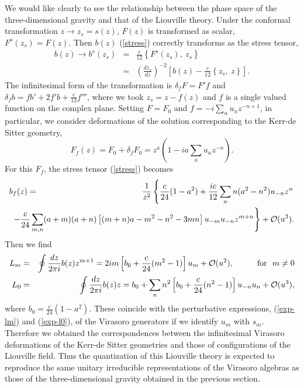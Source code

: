 \documentclass[a4paper,11pt]{article}
\begin{document}
We would like clearly to see the relationship between 
the phase space of the three-dimensional gravity and 
that of the Liouville theory.
Under the conformal transformation $z\longrightarrow z_s=s(z)$, 
$F(z)$ is transformed as scalar, $F^s(z_s)=F(z)$.
Then $b(z)$ (\ref{stress}) correctly transforms as the stress tensor,
\begin{eqnarray}
b(z)\longrightarrow b^s(z_s) 
 &=& \frac{c}{12}\left\{F^s(z_s), \ z_s\right\} \nonumber \\
 &=& \left(\frac{dz_s}{dz}\right)^{-2}
  \left[b(z)-\frac{c}{12}\left\{z_s, \ z\right\}\right].
\end{eqnarray}
The infinitesimal form of the transformation is $\delta_f F=F'f$ 
and $\delta_f b =fb'+2f'b+\frac{c}{12}f'''$, 
where we took $z_s=z-f(z)$ and $f$ is a single valued function on the complex
plane.
Setting $F=F_0$ and $f=-i\sum_n u_n z^{-n+1}$, in particular, 
we consider deformations of the solution 
corresponding to the Kerr-de Sitter geometry,
\begin{equation}
 F_f(z)=F_0+\delta_f F_0=z^a\left(1-ia\sum_n u_nz^{-n}\right).
\end{equation}
For this $F_f$, the stress tensor (\ref{stress}) becomes
\begin{eqnarray}
b_f(z)&=&\frac{1}{z^2}\left\{\frac{c}{24}(1-a^2)
      +\frac{ic}{12}\sum_n n(a^2-n^2)u_{-n}z^n \right. \nonumber \\
&& \hspace*{-13.5mm}   
   \left. -\frac{c}{24}\sum_{m,n}(a+m)(a+n)
      \left[(m+n)a-m^2-n^2-3mn\right]u_{-m}u_{-n}z^{m+n}\right\}
        +{\cal O}(u^3).
\end{eqnarray}
Then we find 
\begin{eqnarray}
L_m &=& \oint\frac{dz}{2\pi i}b(z)z^{m+1}
     = 2im\left[b_0+\frac{c}{24}(m^2-1)\right]u_m +{\cal O}(u^2),
       \hspace{10mm} \mbox{for} \ \ m\neq 0   \nonumber \\
L_0 &=& \oint\frac{dz}{2\pi i}b(z)z
     = b_0 + \sum_n n^2\left[b_0+\frac{c}{24}(n^2-1)\right]u_{-n}u_n
       +{\cal O}(u^3),
\end{eqnarray}
where $b_0=\frac{c}{24}(1-a^2)$.
These coincide with the perturbative expressions, 
(\ref{exp-lm}) and (\ref{exp-l0}), of the Virasoro generators 
if we identify $u_m$ with $s_m$.
Therefore we obtained the correspondences between the infinitesimal 
Virasoro deformations of the Kerr-de Sitter geometries and those of 
configurations of the Liouville field. 
Thus the quantization of this Liouville theory
is expected to reproduce the same unitary irreducible
representations of the Virasoro algebras 
as those of the three-dimensional gravity obtained 
in the previous section. 
\end{document}
